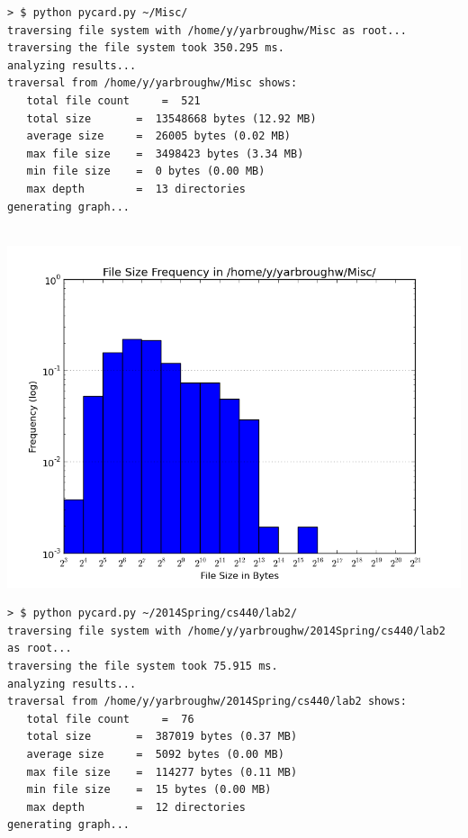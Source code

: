 \newpage

\begin{lstlisting}
> $ python pycard.py ~/Misc/   
traversing file system with /home/y/yarbroughw/Misc as root...
traversing the file system took 350.295 ms.
analyzing results...
traversal from /home/y/yarbroughw/Misc shows:
   total file count 	=  521
   total size 		=  13548668 bytes (12.92 MB)
   average size 	=  26005 bytes (0.02 MB)
   max file size 	=  3498423 bytes (3.34 MB)
   min file size 	=  0 bytes (0.00 MB)
   max depth 		=  13 directories
generating graph...
                         
\end{lstlisting}

\includegraphics[scale=0.7]{assets/pycard-graph-4.png}

\newpage

\begin{lstlisting}
> $ python pycard.py ~/2014Spring/cs440/lab2/ 
traversing file system with /home/y/yarbroughw/2014Spring/cs440/lab2 as root...
traversing the file system took 75.915 ms.
analyzing results...
traversal from /home/y/yarbroughw/2014Spring/cs440/lab2 shows:
   total file count 	=  76
   total size 		=  387019 bytes (0.37 MB)
   average size 	=  5092 bytes (0.00 MB)
   max file size 	=  114277 bytes (0.11 MB)
   min file size 	=  15 bytes (0.00 MB)
   max depth 		=  12 directories
generating graph...
\end{lstlisting}

